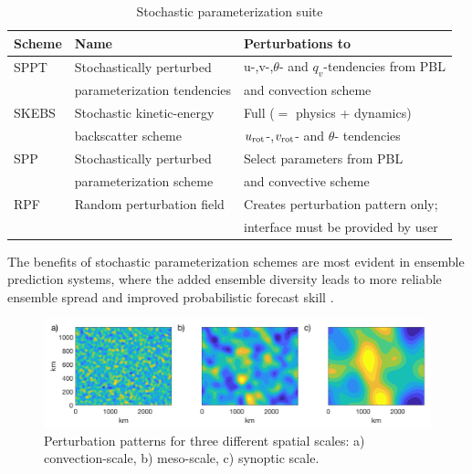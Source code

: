 \begin{table}
\label{stoch_table}
\begin{center}
\caption{Stochastic parameterization suite}
\begin{tabular}{ | l | l | l |}
\hline
Scheme          & Name & Perturbations to \\ 
\hline
SPPT  & Stochastically perturbed    &  u-,v-,$\theta$- and $q_v$-tendencies from PBL\\
      & parameterization tendencies &  and convection scheme\\  \hline

SKEBS & Stochastic kinetic-energy   &  Full ($=$ physics + dynamics) \\
      & backscatter scheme          &  $u_{\rm rot}$-,$v_{\rm rot}$- and $\theta$- tendencies\\  \hline

SPP & Stochastically perturbed      &  Select parameters from PBL \\
    & parameterization scheme       &  and convective scheme\\  \hline

RPF & Random perturbation field     &  Creates perturbation pattern only;  \\
    &                               &  interface must be provided by user\\
\hline
\end{tabular}
\end{center}
\end{table}

The benefits of stochastic parameterization schemes are most evident in ensemble 
prediction systems, where the added ensemble diversity leads to more reliable 
ensemble spread and improved probabilistic forecast skill \citep[e.g.][]{Be15}.

\begin{figure}[h!]
  \includegraphics[width=6.5in]{figures/stoch_pattern.png}
    \caption{Perturbation patterns for three different spatial scales: 
     a) convection-scale, b) meso-scale, c) synoptic scale.}
  \label{stoch_pattern}
\end{figure}


